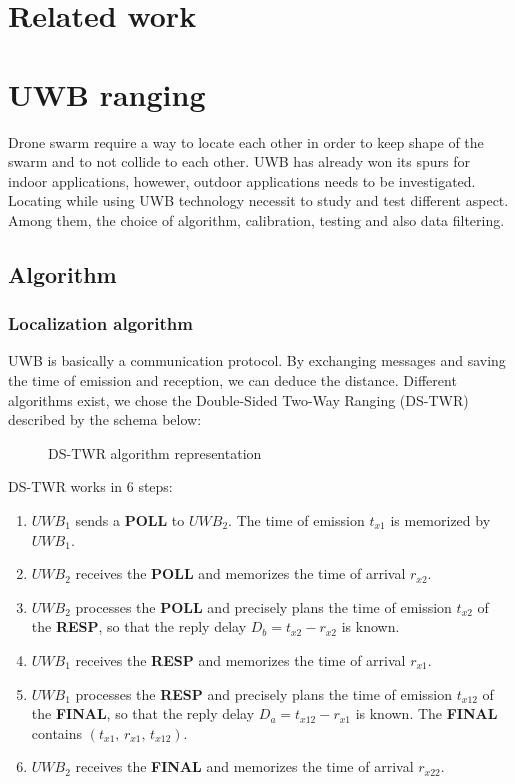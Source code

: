 \documentclass[conference]{IEEEtran}
\begin{document}
\section{Related work}

\section{UWB ranging}
Drone swarm require a way to locate each other in order to keep shape of the swarm and to not collide to each other. UWB has already won its spurs for indoor applications, howewer, outdoor applications needs to be investigated. Locating while using UWB technology necessit to study and test different aspect. Among them, the choice of algorithm, calibration, testing and also data filtering.

\subsection{Algorithm}

\subsubsection{Localization algorithm}
UWB is basically a communication protocol. By exchanging messages and saving
the time of emission and reception, we can deduce the distance. Different
algorithms exist, we chose the Double-Sided Two-Way Ranging (DS-TWR)
described by the schema below:

\begin{figure}[H]
    \centering
    \resizebox{0.8\linewidth}{!}{\DSTWR}
    \caption{DS-TWR algorithm representation}
    \label{fig:DS-TWR}
\end{figure}

DS-TWR works in 6 steps:
\begin{enumerate}
    \item $UWB_1$ sends a \textbf{POLL} to $UWB_2$. The time of emission
          $t_{x1}$ is memorized by $UWB_1$.
    \item $UWB_2$ receives the \textbf{POLL} and memorizes the time of
          arrival $r_{x2}$.
    \item $UWB_2$ processes the \textbf{POLL} and precisely plans the time
          of emission $t_{x2}$ of the \textbf{RESP}, so that the reply
          delay $D_b = t_{x2} - r_{x2}$ is known.
    \item $UWB_1$ receives the \textbf{RESP} and memorizes the time of
          arrival $r_{x1}$.
    \item $UWB_1$ processes the \textbf{RESP} and precisely plans the time
          of emission $t_{x12}$ of the \textbf{FINAL}, so that the reply
          delay $D_a = t_{x12} - r_{x1}$ is known. The \textbf{FINAL}
          contains $(t_{x1},\, r_{x1},\, t_{x12})$.
    \item $UWB_2$ receives the \textbf{FINAL} and memorizes the time of
          arrival $r_{x22}$.
\end{enumerate}
\end{document}
